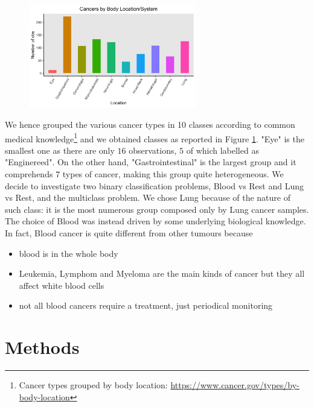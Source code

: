 \documentclass[a4paper,11pt, oneside]{article}  %
\begin{document}
	\begin{figure}
		\includegraphics[width=0.65\textwidth]{plot1.png}
		\label{fig1}
	\end{figure}
	
	We hence grouped the various cancer types in 10 classes according to common medical knowledge\footnote{Cancer types grouped by body location: \url{https://www.cancer.gov/types/by-body-location}} and we obtained classes as reported in Figure \ref{fig1}.  "Eye" is the smallest one as there are only $16$ observations, $5$ of which labelled as "Enginereed". On the other hand, "Gastrointestinal" is the largest group and it comprehends $7$ types of cancer,  making this group quite heterogeneous.
	We decide to investigate two binary classification problems,  Blood vs Rest and Lung vs Rest, and the multiclass problem. We chose Lung because of the nature of such class: it is the most numerous group composed only by Lung cancer samples. The choice of Blood was instead driven by some underlying biological knowledge. In fact,  Blood cancer is quite different from other tumours because
	\begin{itemize}
		\item blood is in the whole body
		\item Leukemia, Lymphom and Myeloma are the main kinds of cancer but they all affect white blood cells
		\item not all blood cancers require a treatment, just periodical monitoring
	\end{itemize} 
	
	
	\section{Methods}
\end{document}
